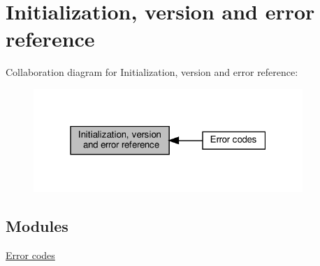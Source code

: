 \hypertarget{group__init}{}\section{Initialization, version and error reference}
\label{group__init}
Collaboration diagram for Initialization, version and error reference\+:
\nopagebreak
\begin{figure}[H]
\begin{center}
\leavevmode
\includegraphics[width=289pt]{group__init}
\end{center}
\end{figure}
\subsection*{Modules}
\begin{DoxyCompactItemize}
\item 
\hyperlink{group__errors}{Error codes}
\end{DoxyCompactItemize}
